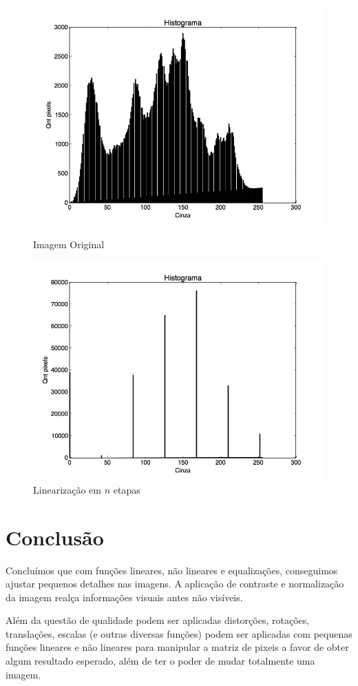 \documentclass{article}
\begin{document}
\FloatBarrier
\begin{figure}[!htb]
\begin{minipage}[b]{0.45\linewidth}
\centering
\includegraphics[scale=0.25]{Histo_lena_B.jpg}
\caption{Imagem Original}
\label{fig:original}
\end{minipage}
\hspace{0.5cm}
\begin{minipage}[b]{0.45\linewidth}
\centering
\includegraphics[scale=0.25]{Histo_DiminuirBits.jpg}
\caption{Linearização em $n$ etapas}
\label{fig:rota}
\end{minipage}
\end{figure}
\FloatBarrier

\section{Conclusão}
Concluímos que com funções lineares, não lineares e equalizações, conseguimos ajustar pequenos detalhes nas imagens. A aplicação de contraste e normalização da imagem realça informações visuais antes não visíveis.

Além da questão de qualidade podem ser aplicadas distorções, rotações, translações, escalas (e outras diversas funções) podem ser aplicadas com pequenas funções lineares e não lineares para manipular a matriz de pixeis a favor de obter algum resultado esperado, além de ter o poder de mudar totalmente uma imagem.
\end{document}
